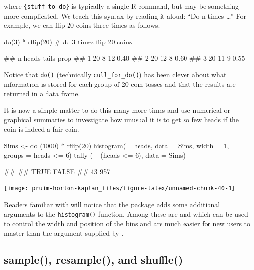 \noindent
where \texttt{\{stuff\ to\ do\}} is typically a single R command, but
may be something more complicated. We teach this syntax by reading it
aloud: ``Do n times \ldots{}'' For example, we can flip 20 coins three
times as follows.

\begin{Schunk}
\begin{Sinput}
do(3) * rflip(20)   # do 3 times flip 20 coins
\end{Sinput}
\begin{Soutput}
##    n heads tails prop
## 1 20     8    12 0.40
## 2 20    12     8 0.60
## 3 20    11     9 0.55
\end{Soutput}
\end{Schunk}

\noindent
Notice that \texttt{do()} (technically \texttt{cull\_for\_do()}) has
been clever about what information is stored for each group of 20 coin
tosses and that the results are returned in a data frame.

It is now a simple matter to do this many more times and use numerical
or graphical summaries to investigate how unusual it is to get so few
heads if the coin is indeed a fair coin.

\begin{Schunk}
\begin{Sinput}
Sims <- do (1000) * rflip(20)
histogram( ~ heads, data = Sims, width = 1, groups = heads <= 6)
tally ( ~ (heads <= 6), data = Sims)
\end{Sinput}
\begin{Soutput}
## 
##  TRUE FALSE 
##    43   957
\end{Soutput}


\begin{center}\texttt{[image: pruim-horton-kaplan\_files/figure-latex/unnamed-chunk-40-1]} \end{center}

\end{Schunk}

\noindent
Readers familiar with  will notice that the 
package adds some additional arguments to the \texttt{histogram()}
function. Among these are  and  which can be
used to control the width and position of the bins and are much easier
for new users to master than the  argument supplied by
.

\subsection{sample(), resample(), and
shuffle()}\label{sample-resample-and-shuffle}

